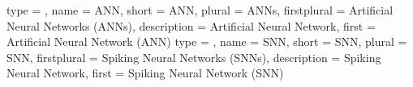 %
%
%

{
	type        = \acronymtype,
	name        = {ANN},
	short       = {ANN},
	plural      = ANNs,
	firstplural = Artificial Neural Networks (ANNs),
	description = {Artificial Neural Network},
	first       = {Artificial Neural Network (ANN)}
}
{
	type        = \acronymtype,
	name        = {SNN},
	short       = {SNN},
	plural      = SNN,
	firstplural = Spiking Neural Networks (SNNs),
	description = {Spiking Neural Network},
	first       = {Spiking Neural Network (SNN)}
}
